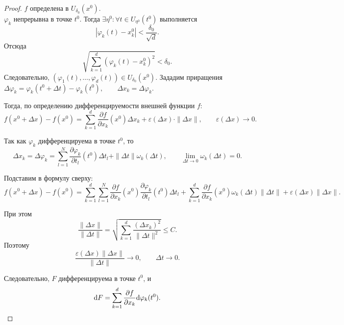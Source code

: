 \documentclass[12pt,a4paper]{report}
\begin{document}
\begin{proof}
    $f$ определена в $U_{\delta_0}(x^0)$. \\
    $\varphi_k$ непрерывна в точке $t^0$. Тогда $\exists\eta^0\colon \forall t\in U_{\eta^0}(t^0)$ выполняется
    \[
    |\varphi_k(t)-x_k^0|<\frac{\delta_0}{\sqrt d}.
    \]
    Отсюда
    \[
    \sqrt{\sum_{k=1}^d(\varphi_k(t)-x_k^0)^2}<\delta_0.
    \]
    Следовательно, $(\varphi_1(t),\dots,\varphi_d(t))\in U_{\delta_0}(x^0)$. Зададим приращения $\Delta\varphi_k=\varphi_k(t^0+\Delta t)-\varphi_k(t^0), \qquad \Delta x_k=\Delta\varphi_k$.

    Тогда, по определению дифференцируемости внешней функции $f$:
    \[
    f(x^0+\Delta x)-f(x^0)=\sum_{k=1}^d\frac{\partial f}{\partial x_k}(x^0)\Delta x_k+\varepsilon(\Delta x)\cdot\|\Delta x\|,
    \qquad \varepsilon(\Delta x)\to0.
    \]

    Так как $\varphi_k$ дифференцируема в точке $t^0$, то
    \[
    \Delta x_k=\Delta\varphi_k=\sum_{l=1}^N\frac{\partial\varphi_k}{\partial t_l}(t^0)\Delta t_l+\|\Delta t\|\omega_k(\Delta t), \qquad
    \lim_{\Delta t\to0}\omega_k(\Delta t)=0.
    \]

    Подставим в формулу сверху:
    \[
    f(x^0+\Delta x)-f(x^0)=
    \sum_{k=1}^d\sum_{l=1}^N
    \frac{\partial f}{\partial x_k}(x^0)
    \frac{\partial\varphi_k}{\partial t_l}(t^0)\Delta t_l+
    \sum_{k=1}^d\frac{\partial f}{\partial x_k}(x^0)\omega_k(\Delta t)\|\Delta t\|
    +\varepsilon(\Delta x)\|\Delta x\|.
    \]

    При этом
    \[
    \frac{\|\Delta x\|}{\|\Delta t\|}
    =\sqrt{\sum_{k=1}^d\frac{(\Delta x_k)^2}{\|\Delta t\|^2}}\leq C.
    \]
    Поэтому
    \[
    \frac{\varepsilon(\Delta x)\|\Delta x\|}{\|\Delta t\|}\to0, \qquad \Delta t\to0.
    \]

    Следовательно, $F$ дифференцируема в точке $t^0$, и
    \[
    \d F=\sum_{k=1}^d\frac{\partial f}{\partial x_k}\d\varphi_k(t^0).
    \]
\end{proof}

\corollary{
\[
\frac{\partial F}{\partial t_l}=\sum_{k=1}^d\frac{\partial f}{\partial x_k}(x^0)\frac{\partial\varphi_k}{\partial t_l}(t^0).
\]
}

\end{document}
